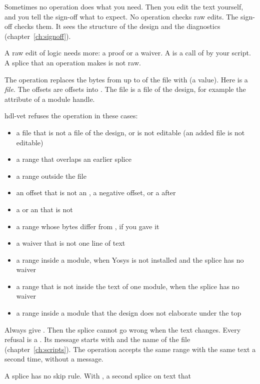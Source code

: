 Sometimes no operation does what you need. Then you edit the text yourself, and you
tell the sign-off what to expect. No operation checks raw edits. The sign-off checks
them. It sees the structure of the design and the diagnostics (chapter~\ref{ch:signoff}).

A raw edit of logic needs more: a proof or a waiver. A  is a call of
 by your script. A splice that an operation makes is not raw.

\begin{entry}{}
\item[Writes] The operation replaces the bytes from  up to  of the
  file  with  (a  value). Here  is a
  \emph{file}. The offsets are offsets into . The file is a file of
  the design, for example the attribute  of a module handle.
\item[Refused] hdl-vet refuses the operation in these cases:
  \begin{itemize}
  \item a file that is not a file of the design, or is not editable (an added file is
    not editable)
  \item a range that overlaps an earlier splice
  \item a range outside the file
  \item an offset that is not an , a negative offset, or a  after
  \item a  or an  that is not 
  \item a range whose bytes differ from , if you gave it
  \item a waiver that is not one line of text
  \item a range inside a module, when Yosys is not installed and the splice has no waiver
  \item a range that is not inside the text of one module, when the splice has no waiver
  \item a range inside a module that the design does not elaborate under the top
  \end{itemize}
  Always give . Then the splice cannot go wrong when the text changes. Every
  refusal is a . Its message starts with  and the name of the
  file (chapter~\ref{ch:scripts}). The operation accepts the same range with the same text a
  second time, without a message.
\item[Again] A splice has no skip rule. With , a second splice on text that

\end{entry}
